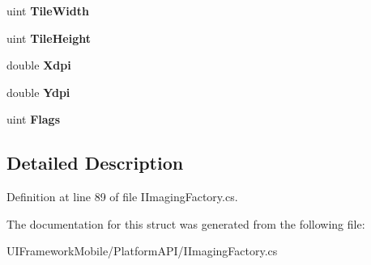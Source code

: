 \begin{DoxyCompactItemize}
\item 
\hypertarget{struct_microsoft_1_1_drawing_1_1_image_info_aea450e0a15baaac9b0b960f12fef9af8}{
uint {\bfseries TileWidth}}
\label{struct_microsoft_1_1_drawing_1_1_image_info_aea450e0a15baaac9b0b960f12fef9af8}

\item 
\hypertarget{struct_microsoft_1_1_drawing_1_1_image_info_ae54f775a880eb4e93f130d415abbc108}{
uint {\bfseries TileHeight}}
\label{struct_microsoft_1_1_drawing_1_1_image_info_ae54f775a880eb4e93f130d415abbc108}

\item 
\hypertarget{struct_microsoft_1_1_drawing_1_1_image_info_aa09f6e7e4b97565389bbab26825c2263}{
double {\bfseries Xdpi}}
\label{struct_microsoft_1_1_drawing_1_1_image_info_aa09f6e7e4b97565389bbab26825c2263}

\item 
\hypertarget{struct_microsoft_1_1_drawing_1_1_image_info_ac861df2a61ef089f9634e9ce35a1556b}{
double {\bfseries Ydpi}}
\label{struct_microsoft_1_1_drawing_1_1_image_info_ac861df2a61ef089f9634e9ce35a1556b}

\item 
\hypertarget{struct_microsoft_1_1_drawing_1_1_image_info_a31a18ed28faed36fa6906aeb6f4e6456}{
uint {\bfseries Flags}}
\label{struct_microsoft_1_1_drawing_1_1_image_info_a31a18ed28faed36fa6906aeb6f4e6456}

\end{DoxyCompactItemize}


\subsection{Detailed Description}


Definition at line 89 of file IImagingFactory.cs.

The documentation for this struct was generated from the following file:\begin{DoxyCompactItemize}
\item 
UIFrameworkMobile/PlatformAPI/IImagingFactory.cs\end{DoxyCompactItemize}
